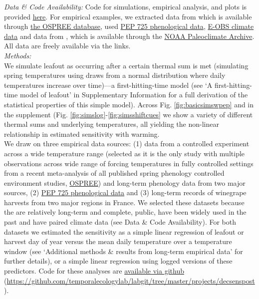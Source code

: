 \documentclass[11pt,letter]{article}
\begin{document}
\emph{Data \& Code Availability:} Code for simulations, empirical analysis, and plots is provided \href{https://github.com/temporalecologylab/labgit/tree/master/projects/decsenspost}{here}. For empirical examples, we extracted data from \citet{Charrier:2011aa} which is available through \href{https://knb.ecoinformatics.org}{the OSPREE database}, used \href{http://www.pep725.eu/data.php}{PEP 725 phenological data}, \href{https://surfobs.climate.copernicus.eu/dataaccess/access_eobs.php}{E-OBS climate data} and data from \citet{cookwine2016}, which is available through the \href{https://www.ncdc.noaa.gov/data-access/paleoclimatology-data/datasets}{NOAA Paleoclimate Archive}. All data are freely available via the links.\\

\emph{Methods:} \\ %
We simulate leafout as occurring after a certain thermal sum is met (simulating spring temperatures using draws from a normal distribution where daily temperatures increase over time)---a first-hitting-time model (see `A first-hitting-time model of leafout' in Supplementary Information for a full derivation of the statistical properties of this simple model). Across Fig. \ref{fig:basicsimswpep} and in the supplement (Fig. \ref{fig:simslog}-\ref{fig:simsshiftcues} we show a variety of different thermal sums and underlying temperatures, all yielding the non-linear relationship in estimated sensitivity with warming. \\

We draw on three empirical data sources: (1) data from a controlled experiment across a wide temperature range \citep{Charrier:2011aa} (selected as it is the only study with multiple observations across wide range of forcing temperatures in fully controlled settings from a recent meta-analysis of all published spring phenology controlled environment studies, \href{https://knb.ecoinformatics.org/view/doi:10.5063/F1QV3JQR}{OSPREE}) and long-term phenology data from two major sources, (2) \href{http://www.pep725.eu/data.php}{PEP 725 phenological data} and (3) long-term records of winegrape harvests from two major regions in France. We selected these datasets because the are relatively long-term and complete, public, have been widely used in the past and have paired climate data (see Data \& Code Availability). For both datasets we estimated the sensitivity as a simple linear regression of leafout or harvest day of year versus the mean daily temperature over a temperature window (see `Additional methods \& results from long-term empirical data' for further details), or a simple linear regression using logged versions of these predictors. Code for these analyses are \href{https://github.com/temporalecologylab/labgit/tree/master/projects/decsenspost}{available via github} (\url{https://github.com/temporalecologylab/labgit/tree/master/projects/decsenspost}).\\
\end{document}
